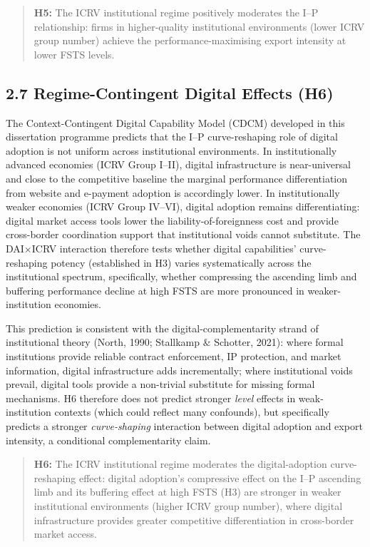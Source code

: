 \documentclass[
  12pt]{article}
\begin{document}
\begin{quote}
\textbf{H5:} The ICRV institutional regime positively moderates the I--P
relationship: firms in higher-quality institutional environments (lower
ICRV group number) achieve the performance-maximising export intensity
at lower FSTS levels.
\end{quote}

\hypertarget{regime-contingent-digital-effects-h6}{%
\subsection{2.7 Regime-Contingent Digital Effects
(H6)}\label{regime-contingent-digital-effects-h6}}

The Context-Contingent Digital Capability Model (CDCM) developed in this
dissertation programme predicts that the I--P curve-reshaping role of
digital adoption is not uniform across institutional environments. In
institutionally advanced economies (ICRV Group I--II), digital
infrastructure is near-universal and close to the competitive baseline
the marginal performance differentiation from website and e-payment
adoption is accordingly lower. In institutionally weaker economies (ICRV
Group IV--VI), digital adoption remains differentiating: digital market
access tools lower the liability-of-foreignness cost and provide
cross-border coordination support that institutional voids cannot
substitute. The DAI×ICRV interaction therefore tests whether digital
capabilities' curve-reshaping potency (established in H3) varies
systematically across the institutional spectrum, specifically, whether
compressing the ascending limb and buffering performance decline at high
FSTS are more pronounced in weaker-institution economies.

This prediction is consistent with the digital-complementarity strand of
institutional theory (North, 1990; Stallkamp \& Schotter, 2021): where
formal institutions provide reliable contract enforcement, IP
protection, and market information, digital infrastructure adds
incrementally; where institutional voids prevail, digital tools provide
a non-trivial substitute for missing formal mechanisms. H6 therefore
does not predict stronger \emph{level} effects in weak-institution
contexts (which could reflect many confounds), but specifically predicts
a stronger \emph{curve-shaping} interaction between digital adoption and
export intensity, a conditional complementarity claim.

\begin{quote}
\textbf{H6:} The ICRV institutional regime moderates the
digital-adoption curve-reshaping effect: digital adoption's compressive
effect on the I--P ascending limb and its buffering effect at high FSTS
(H3) are stronger in weaker institutional environments (higher ICRV
group number), where digital infrastructure provides greater competitive
differentiation in cross-border market access.
\end{quote}
\end{document}
